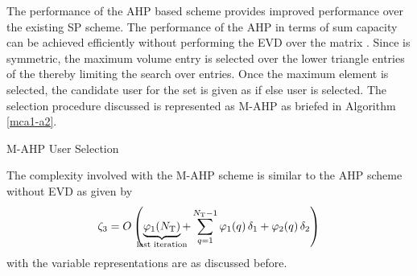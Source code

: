 The performance of the \ac{AHP} based scheme provides improved performance over the existing \ac{SP} scheme. The performance of the \ac{AHP} in terms of sum capacity can be achieved efficiently without performing the EVD over the matrix . Since  is symmetric, the maximum volume entry is selected over the lower triangle entries of the  thereby limiting the search over  entries. Once the maximum element  is selected, the candidate user for the set  is given as  if  else user  is selected. The selection procedure discussed is represented as \ac{M-AHP} as briefed in Algorithm \ref{mca1-a2}.
\begin{algorithm}
 \SetAlgoLined
 \DontPrintSemicolon
 \caption{\ac{M-AHP} User Selection}
 \label{mca1-a2}
\end{algorithm}

The complexity involved with the \ac{M-AHP} scheme is similar to the \ac{AHP} scheme without EVD as given by
\begin{eqnarray*}
\zeta_3 = O \left ( \underbrace{\varphi_1(N_\mrm{T})}_{\mathclap{\text{last iteration}}} + \sum^{N_\mrm{T} - 1}_{q = 1} \varphi_1(q) \, \delta_1 + \varphi_2(q) \, \delta_2 \right )
\end{eqnarray*}
with the variable representations are as discussed before.

